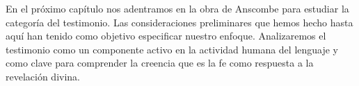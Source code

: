En el próximo capítulo nos adentramos en la obra de Anscombe para estudiar la categoría del testimonio. Las consideraciones preliminares que hemos hecho hasta aquí han tenido como objetivo especificar nuestro enfoque.  Analizaremos el testimonio como un componente activo en la actividad humana del lenguaje y como clave para comprender la creencia que es la fe como respuesta a la revelación divina.
